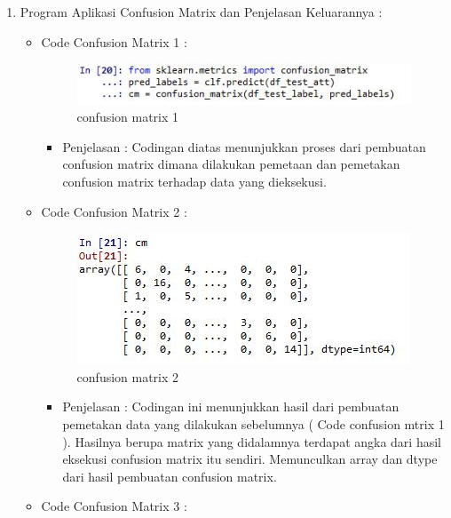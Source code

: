 \begin{enumerate}
\par
\par
\item Program Aplikasi Confusion Matrix dan Penjelasan Keluarannya :
\begin{itemize}
\item Code Confusion Matrix 1 :
\par
\begin{figure}[ht]
\centering
\includegraphics[scale=0.2]{figures/Con1.jpg}
\caption{confusion matrix 1}
\label{contoh}
\end{figure}
\par
\begin{itemize}
\item Penjelasan : Codingan diatas menunjukkan proses dari pembuatan confusion matrix dimana dilakukan pemetaan dan pemetakan confusion matrix terhadap data yang dieksekusi.
\par 
\par
\end{itemize}
\item Code Confusion Matrix 2 :
\par
\begin{figure}[ht]
\centering
\includegraphics[scale=0.2]{figures/con2.jpg}
\caption{confusion matrix 2}
\label{contoh}
\end{figure}
\par
\begin{itemize}
\item Penjelasan : Codingan ini menunjukkan hasil dari pembuatan pemetakan data yang dilakukan sebelumnya ( Code confusion mtrix 1 ). Hasilnya berupa matrix yang didalamnya terdapat angka dari hasil eksekusi confusion matrix itu sendiri. Memunculkan array dan dtype dari hasil pembuatan confusion matrix.
\par
\par
\end{itemize}
\item Code Confusion Matrix 3 :

\end{itemize}
\end{enumerate}
